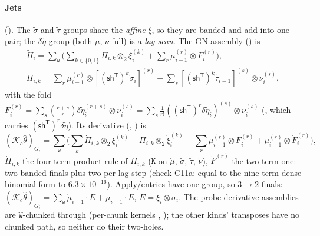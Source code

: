 \documentclass[11pt]{article}
\newcommand{\K}{\mathcal{K}}
\newcommand{\Sh}{\mathsf{sh}}
\newcommand{\T}{\mathsf{T}}
\newcommand{\thh}{\hat\theta}
\newcommand{\ddet}{\delta\tilde\eta}
\theoremstyle{definition}
\theoremstyle{plain}
\begin{document}
\paragraph{Jets} (). The $\tilde\sigma$ and $\tilde\tau$ groups share the
\emph{affine} $\xi$, so they are banded and add into one pair; the $\ddet$ group (both $\mu$, $\nu$ full) is a
\emph{lag scan}. The GN assembly () is
\begin{equation}
  \label{eq:asmjet}
  \begin{gathered}
  \tilde H_i=\sum_{\mathtt W}\Big(\sum_{k\in\{0,1\}}\Pi_{i,k}\otimes_2\xi_i^{(k)}
     +\sum_r\mu_{i-1}^{(r)}\otimes F_i^{(r)}\Big),\\
  \Pi_{i,k}=\sum_r\mu_{i-1}^{(r)}\otimes[(\Sh^\T)^k\tilde\sigma_i]^{(r)}+\sum_s[(\Sh^\T)^k\tilde\tau_{i-1}]^{(s)}\otimes\nu_i^{(s)},
  \end{gathered}
\end{equation}
with the fold $F_i^{(r)}=\sum_s\binom{r+s}{r}\ddet_i^{(r+s)}\otimes\nu_i^{(s)}=\sum_s\frac{1}{r!}((\Sh^\T)^r\ddet_i)^{(s)}\otimes\nu_i^{(s)}$
(, which carries $(\Sh^\T)^r\ddet$). Its derivative (,
) is
\begin{equation}
  \label{eq:asmjetdot}
  (\K_c\thh)_{G_i}=\sum_{\mathtt W}\Big(\sum_k\dot\Pi_{i,k}\otimes_2\xi_i^{(k)}+\Pi_{i,k}\otimes_2\dot\xi_i^{(k)}
     +\sum_r\dot\mu_{i-1}^{(r)}\otimes F_i^{(r)}+\mu_{i-1}^{(r)}\otimes\dot F_i^{(r)}\Big),
\end{equation}
$\dot\Pi_{i,k}$ the four-term product rule of $\Pi_{i,k}$ ($\mathtt K$ on $\dot\mu$, $\dot{\tilde\sigma}$,
$\dot{\tilde\tau}$, $\dot\nu$), $\dot F^{(r)}$ the two-term one: two banded finals plus two per lag step (check
C11a: equal to the nine-term dense binomial form to $6.3\times10^{-16}$). Apply/entries have one group, so
$3\to2$ finals: $(\K_c\thh)_{G_i}=\sum_{\mathtt W}\dot\mu_{i-1}\cdot E+\mu_{i-1}\cdot\dot E$, $E=\xi_i\otimes\hat\sigma_i$.
The probe-derivative assemblies are $\mathtt W$-chunked through  (per-chunk kernels
, ); the other kinds' transposes have no chunked
path, so neither do their two-holes.
\end{document}
